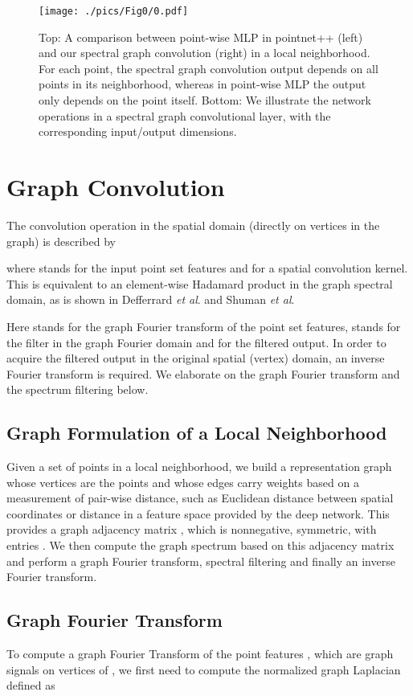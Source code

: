 \documentclass[runningheads]{llncs}
\newcommand{\etal}{\textit{et al}. }
\begin{document}
\begin{figure}[t]
	\centering
	\texttt{[image: ./pics/Fig0/0.pdf]}
	\caption{{\sc Top:} A comparison between point-wise MLP in pointnet++ (left) and our spectral graph convolution (right) in a local neighborhood. For each point, the spectral graph convolution output depends on all points in its neighborhood, whereas in point-wise MLP the output only depends on the point itself. {\sc Bottom:} We illustrate the network operations in a spectral graph convolutional layer, with the corresponding input/output dimensions.}
	\label{fig:fig0}
\end{figure}


\section{Graph Convolution}\label{sec:gCNN}
The convolution operation in the spatial domain (directly on vertices in the graph) is described by

where  stands for the input point set features and  for a spatial convolution kernel. This is equivalent to an element-wise Hadamard product in the graph spectral domain, as is shown in Defferrard \etal \cite{defferrard2016convolutional} and Shuman \etal \cite{shuman2013emerging}

Here  stands for the graph Fourier transform of the point set features,  stands for the filter in the graph Fourier domain and  for the filtered output. In order to acquire the filtered output in the original spatial (vertex) domain, an inverse Fourier transform is required. We elaborate on the graph Fourier transform and the spectrum filtering below.

\subsection{Graph Formulation of a Local Neighborhood}
Given a set of  points  in a local neighborhood, we build a representation graph  whose vertices  are the points and whose edges  carry weights  based on a measurement of pair-wise distance, such as Euclidean distance between  spatial coordinates or distance in a feature space provided by the deep network. This provides a graph adjacency matrix , which is  nonnegative, symmetric, with entries . We then compute the graph spectrum based on this adjacency matrix and perform a graph Fourier transform, spectral filtering and finally an inverse Fourier transform.


\subsection{Graph Fourier Transform}
To compute a graph Fourier Transform of the point features , which are graph signals on vertices of , we first need to compute the normalized graph Laplacian defined as
\end{document}
